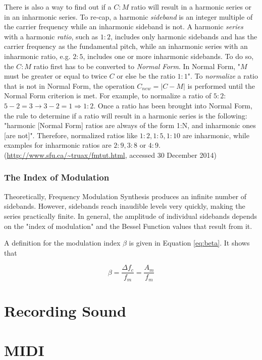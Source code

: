 \documentclass[12pt,twoside]{report}
\begin{document}
\noindent There is also a way to find out if a $C:M$ ratio will result in a harmonic series or in an inharmonic series. To re-cap, a harmonic \emph{sideband} is an integer multiple of the carrier frequency while an inharmonic sideband is not. A harmonic \emph{series} with a harmonic \emph{ratio}, such as $1:2$, includes only harmonic sidebands and has the carrier frequency as the fundamental pitch, while an inharmonic series with an inharmonic ratio, e.g. $2:5$, includes one or more inharmonic sidebands. To do so, the $C:M$ ratio first has to be converted to \emph{Normal Form}. In Normal Form, "$M$ must be greater or equal to twice $C$ or else be the ratio $1:1$". To \emph{normalize} a ratio that is not in Normal Form, the operation $C_{new} = | C - M |$ is performed until the Normal Form criterion is met. For example, to normalize a ratio of $5:2$: $5 - 2 = 3 \rightarrow 3 - 2 = 1 \Rightarrow 1:2$. Once a ratio has been brought into Normal Form, the rule to determine if a ratio will result in a harmonic series is the following: "harmonic [Normal Form] ratios are always of the form 1:N, and inharmonic ones [are not]". Therefore, normalized ratios like
$1:2, 1:5, 1:10$ are inharmonic, while examples for inharmonic ratios are $2:9, 3:8 \text{ or } 4:9$.
(\url{http://www.sfu.ca/~truax/fmtut.html}, accessed 30 December 2014)

\subsection{The Index of Modulation}

Theoretically, Frequency Modulation Synthesis produces an infinite number of sidebands. However, sidebands reach inaudible levels very quickly, making the series practically finite. In general, the amplitude of individual sidebands depends on the "index of modulation" and the Bessel Function values that result from it.

\noindent A definition for the modulation index $\beta$ is given in Equation \ref{eq:beta}. It shows that

\begin{equation}
  \beta = \frac{\Delta f_{c}}{f_{m}} = \frac{A_{m}}{f_{m}}
\end{equation}

\chapter{Recording Sound}

\chapter{MIDI}
\end{document}
